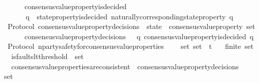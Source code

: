 \begin{isabellebody}
\ \ \isanewline
\ \ \ \ {\isachardoublequoteopen}consensus{\isacharunderscore}value{\isacharunderscore}property{\isacharunderscore}is{\isacharunderscore}decided\ \isanewline
\ \ \ \ \ \ {\isacharequal}\ {\isacharparenleft}{\isasymlambda}{\isacharparenleft}q{\isacharcomma}\ {\isasymsigma}{\isacharparenright}{\isachardot}\ state{\isacharunderscore}property{\isacharunderscore}is{\isacharunderscore}decided\ {\isacharparenleft}naturally{\isacharunderscore}corresponding{\isacharunderscore}state{\isacharunderscore}property\ q{\isacharcomma}\ {\isasymsigma}{\isacharparenright}{\isacharparenright}{\isachardoublequoteclose}\isanewline
\isanewline
\isanewline
{}\isamarkupfalse%
\ {\isacharparenleft}\ Protocol{\isacharparenright}\ consensus{\isacharunderscore}value{\isacharunderscore}property{\isacharunderscore}decisions\ {\isacharcolon}{\isacharcolon}\ {\isachardoublequoteopen}state\ {\isasymRightarrow}\ consensus{\isacharunderscore}value{\isacharunderscore}property\ set{\isachardoublequoteclose}\isanewline
\ \ \isanewline
\ \ \ \ {\isachardoublequoteopen}consensus{\isacharunderscore}value{\isacharunderscore}property{\isacharunderscore}decisions\ {\isasymsigma}\ {\isacharequal}\ {\isacharbraceleft}q{\isachardot}\ consensus{\isacharunderscore}value{\isacharunderscore}property{\isacharunderscore}is{\isacharunderscore}decided\ {\isacharparenleft}q{\isacharcomma}\ {\isasymsigma}{\isacharparenright}{\isacharbraceright}{\isachardoublequoteclose}\isanewline
\isanewline
\isanewline
{}\isamarkupfalse%
\ {\isacharparenleft}\ Protocol{\isacharparenright}\ n{\isacharunderscore}party{\isacharunderscore}safety{\isacharunderscore}for{\isacharunderscore}consensus{\isacharunderscore}value{\isacharunderscore}properties\ {\isacharcolon}\isanewline
\ \ {\isachardoublequoteopen}{\isasymforall}\ {\isasymsigma}{\isacharunderscore}set{\isachardot}\ {\isasymsigma}{\isacharunderscore}set\ {\isasymsubseteq}\ {\isasymSigma}t\isanewline
\ \ {\isasymlongrightarrow}\ finite\ {\isasymsigma}{\isacharunderscore}set\isanewline
\ \ {\isasymlongrightarrow}\ is{\isacharunderscore}faults{\isacharunderscore}lt{\isacharunderscore}threshold\ {\isacharparenleft}{\isasymUnion}\ {\isasymsigma}{\isacharunderscore}set{\isacharparenright}\isanewline
\ \ {\isasymlongrightarrow}\ consensus{\isacharunderscore}value{\isacharunderscore}properties{\isacharunderscore}are{\isacharunderscore}consistent\ {\isacharparenleft}{\isasymUnion}\ {\isacharbraceleft}consensus{\isacharunderscore}value{\isacharunderscore}property{\isacharunderscore}decisions\ {\isasymsigma}\ {\isacharbar}\ {\isasymsigma}{\isachardot}\ {\isasymsigma}\ {\isasymin}\ {\isasymsigma}{\isacharunderscore}set{\isacharbraceright}{\isacharparenright}{\isachardoublequoteclose}\isanewline

\end{isabellebody}
